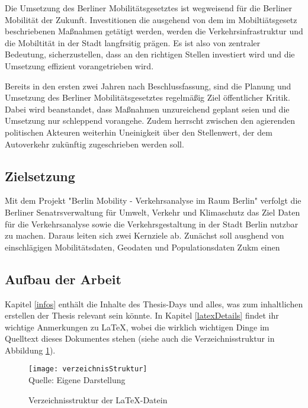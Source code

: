 Die Umsetzung des Berliner Mobilitätsgesetztes ist wegweisend für die Berliner Mobilität der Zukunft. Investitionen die ausgehend von dem im Mobiltiätsgesetz beschriebenen Maßnahmen getätigt werden, werden die Verkehrsinfrastruktur und die Mobiltität in der Stadt langfrsitig prägen. Es ist also von zentraler Bedeutung, sicherzustellen, dass an den richtigen Stellen investiert wird und die Umsetzung effizient vorangetrieben wird. 

 Bereits in den ersten zwei Jahren nach Beschlussfassung, sind die Planung und Umsetzung des Berliner Mobilitätsgesetztes regelmäßig Ziel öffentlicher Kritik. Dabei wird beanstandet, dass Maßnahmen unzureichend geplant seien und die Umsetzung nur schleppend vorangehe.  Zudem herrscht zwischen den agierenden politischen Akteuren weiterhin Uneinigkeit über den Stellenwert, der dem Autoverkehr zukünftig zugeschrieben werden soll.

\subsection{Zielsetzung}
Mit dem Projekt "Berlin Mobility - Verkehrsanalyse im Raum Berlin" verfolgt die Berliner Senatrsverwaltung für Umwelt, Verkehr und Klimaschutz das Ziel Daten für die Verkehrsanalyse sowie die Verkehrsgestaltung in der Stadt Berlin nutzbar zu machen. Daraus leiten sich zwei Kernziele ab. Zunächst soll ausghend von einschlägigen Mobilitätsdaten, Geodaten und Populationsdaten Zukm einen 

\subsection{Aufbau der Arbeit}
Kapitel \ref{infos} enthält die Inhalte des Thesis-Days und alles, was zum inhaltlichen erstellen der Thesis relevant sein könnte. In Kapitel \ref{latexDetails}  findet ihr wichtige Anmerkungen zu \LaTeX{}, wobei die wirklich wichtigen Dinge im Quelltext dieses Dokumentes stehen (siehe auch die Verzeichnisstruktur in Abbildung \ref{fig:verzeichnisStruktur}).


\begin{figure}[H]
\caption{Verzeichnisstruktur der \LaTeX{}-Datein}\label{fig:verzeichnisStruktur}
\texttt{[image: verzeichnisStruktur]}
\\
Quelle: Eigene Darstellung
\end{figure}
